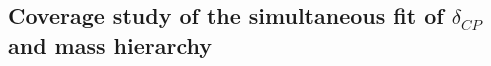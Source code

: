 %
%
%


\clearpage



%
% 

\subsection{Coverage study of the simultaneous fit of $\delta_{CP}$ and mass hierarchy}
\label{sec:coverage_deltacp}


